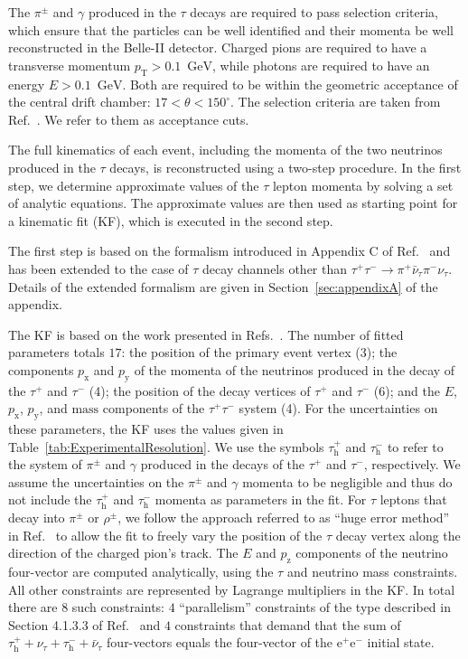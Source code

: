 \documentclass[a4paper,12pt,twocolumn]{article}
\numberwithin{equation}{section} %
\newcommand{\Pagngt}{\ensuremath{\bar{\nu}_{\tau}}\xspace}
\newcommand{\Pem}{\ensuremath{\textrm{e}^{-}}\xspace}
\newcommand{\Pep}{\ensuremath{\textrm{e}^{+}}\xspace}
\newcommand{\Pgg}{\ensuremath{\gamma}\xspace}
\newcommand{\Pgngt}{\ensuremath{\nu_{\tau}}\xspace}
\newcommand{\Pgpm}{\ensuremath{\pi^{-}}\xspace}
\newcommand{\Pgpp}{\ensuremath{\pi^{+}}\xspace}
\newcommand{\Pgppm}{\ensuremath{\pi^{\pm}}\xspace}
\newcommand{\Pgrpm}{\ensuremath{\rho^{\pm}}\xspace}
\newcommand{\Pgt}{\ensuremath{\tau}\xspace}
\newcommand{\Pgtm}{\ensuremath{\tau^{-}}\xspace}
\newcommand{\Pgtp}{\ensuremath{\tau^{+}}\xspace}
\newcommand{\tauhp}{\ensuremath{\Pgt_{\textrm{h}}^{+}}\xspace}
\newcommand{\tauhm}{\ensuremath{\Pgt_{\textrm{h}}^{-}}\xspace}
\newcommand{\GeV}{\ensuremath{\textrm{GeV}}\xspace}
\newcommand{\energy}{\ensuremath{E}\xspace}
\newcommand{\pT}{\ensuremath{p_{\textrm{T}}}\xspace}
\newcommand{\px}{\ensuremath{p_{\textrm{x}}}\xspace}
\newcommand{\py}{\ensuremath{p_{\textrm{y}}}\xspace}
\newcommand{\pz}{\ensuremath{p_{\textrm{z}}}\xspace}
\newcommand{\mass}{\ensuremath{\textrm{mass}}\xspace}
\begin{document}
The $\Pgppm$ and $\Pgg$ produced in the $\Pgt$ decays are required to pass selection criteria, which ensure that the particles can be well identified and their momenta be well reconstructed in the Belle-II detector.
Charged pions are required to have a transverse momentum $\pT > 0.1$~\GeV, while photons are required to have an energy $E > 0.1$~\GeV.
Both are required to be within the geometric acceptance of the central drift chamber: $17 < \theta < 150^{\circ}$.
The selection criteria are taken from Ref.~\cite{Belle:2020lfn}.
We refer to them as acceptance cuts.

The full kinematics of each event, including the momenta of the two neutrinos produced in the $\Pgt$ decays, is reconstructed using a two-step procedure.
In the first step, we determine approximate values of the $\Pgt$ lepton momenta by solving a set of analytic equations.
The approximate values are then used as starting point for a kinematic fit (KF), which is executed in the second step.

The first step is based on the formalism introduced in Appendix C of Ref.~\cite{Altakach:2022ywa} and has been extended to the case of $\Pgt$ decay channels other than $\Pgtp\Pgtm \to \Pgpp\Pagngt\Pgpm\Pgngt$.
Details of the extended formalism are given in Section~\ref{sec:appendixA} of the appendix.

The KF is based on the work presented in Refs.~\cite{Avery:kinfit,Sauerland:1358627,Cherepanov:2018npf}.
The number of fitted parameters totals $17$: the position of the primary event vertex (3); the components $\px$ and $\py$ of the momenta of the neutrinos produced in the decay of the $\Pgtp$ and $\Pgtm$ (4); the position of the decay vertices of $\Pgtp$ and $\Pgtm$ (6); and the $\energy$, $\px$, $\py$, and $\mass$ components of the $\Pgtp\Pgtm$ system (4).
For the uncertainties on these parameters, the KF uses the values given in Table~\ref{tab:ExperimentalResolution}.
We use the symbols $\tauhp$ and $\tauhm$ to refer to the system of $\Pgppm$ and $\Pgg$ produced in the decays of the $\Pgtp$ and $\Pgtm$, respectively. We assume the uncertainties on the $\Pgppm$ and $\Pgg$ momenta to be negligible and thus do not include the $\tauhp$ and $\tauhm$ momenta as parameters in the fit.
For $\Pgt$ leptons that decay into $\Pgppm$ or $\Pgrpm$, we follow the approach referred to as ``huge error method'' in Ref.~\cite{Avery:hugeerror} to allow the fit to freely vary the position of the $\Pgt$ decay vertex along the direction of the charged pion's track.
The $\energy$ and $\pz$ components of the neutrino four-vector are computed analytically, using the $\Pgt$ and neutrino mass constraints.
All other constraints are represented by Lagrange multipliers in the KF. In total there are $8$ such constraints:
$4$ ``parallelism'' constraints of the type described in Section 4.1.3.3 of Ref.~\cite{Sauerland:1358627} and $4$ constraints that demand that the sum of $\tauhp + \Pgngt + \tauhm + \Pagngt$ four-vectors equals the four-vector of the $\Pep\Pem$ initial state. 
\end{document}
